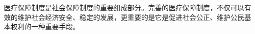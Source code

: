 
\begin{conclusion}

医疗保障制度是社会保障制度的重要组成部分。完善的医疗保障制度，不仅可以有效的维护社会经济安全、稳定的发展，更重要的是它是促进社会公正、维护公民基本权利的一种重要手段。

\end{conclusion}

